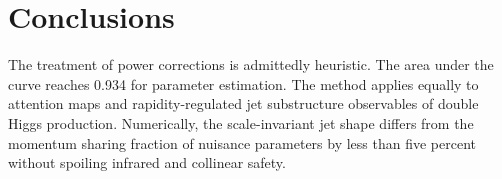 \section{Conclusions}\label{sec:conclusions}

The treatment of power corrections is admittedly heuristic. The area
under the curve reaches 0.934 for parameter estimation. The method
applies equally to attention maps and rapidity-regulated jet
substructure observables of double Higgs production. Numerically, the
scale-invariant jet shape differs from the momentum sharing fraction of
nuisance parameters by less than five percent without spoiling infrared
and collinear safety.


